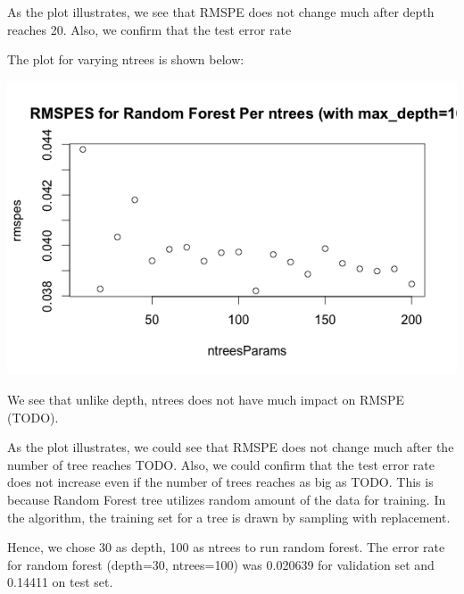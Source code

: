\documentclass[letterpaper,twocolumn,11pt]{article}
\begin{document}
As the plot illustrates, we see that RMSPE does not change much after depth reaches 20. Also, we confirm that the test error rate 

The plot for varying ntrees is shown below:

\includegraphics[scale=0.35]{img/RandomForestPerNtrees.png}

We see that unlike depth, ntrees does not have much impact on RMSPE (TODO).

As the plot illustrates, we could see that RMSPE does not change much after the number of tree reaches TODO. Also, we could confirm that the test error rate does not increase even if the number of trees reaches as big as TODO. This is because Random Forest tree utilizes random amount of the data for training. In the algorithm, the training set for a tree is drawn by sampling with replacement.

Hence, we chose 30 as depth, 100 as ntrees to run random forest. The error rate for random forest (depth=30, ntrees=100) was 0.020639 for validation set and 0.14411 on test set.
\end{document}
